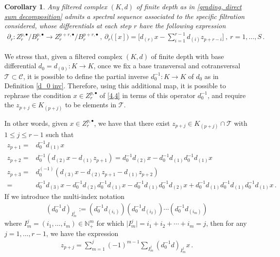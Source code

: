\documentclass[10pt]{amsart}
\newcounter{dummy} \numberwithin{dummy}{section}
\newtheorem{corollary}[dummy]{Corollary}
\theoremstyle{remark}
\numberwithin{equation}{section}
\begin{document}
\begin{corollary}
    Any filtered complex $(K,d)$ of finite depth as in \eqref{grading, direct sum decomposition} admits a spectral sequence associated to the specific filtration considered, whose differentials at each step $r$ have the following expression
    \begin{align*}
        \partial_r\colon Z_r^{p,\bullet}/B_r^{p,\bullet}\to Z_r^{p+r,\bullet}/B_r^{p+r,\bullet}\ ,\ \partial_r\big([x]\big)=\bigg[d_{(r)}x-\sum_{i=1}^{r-1}d_{(i)}z_{p+r-i}\bigg]\ ,\ r=1,\ldots,S\,.
    \end{align*} 
\end{corollary}
We stress that, given a filtered complex $(K,d)$ of finite depth with base differential $d_0=d_{(0)}\colon K\to K$, once we fix a base transversal and cotransversal $\mathcal{T}\subset\mathcal{C}$, it is possible to define the partial inverse $d_0^{-1}\colon K\to K$ of $d_0$ as in Definition \ref{d_0 inv}. Therefore, using this additional map, it is possible to rephrase the condition $x\in Z_r^{p,\bullet}$ of \eqref{4,4} in terms of this operator $d_0^{-1}$, and require the $z_{p+j}\in K_{(p+j)}$ to be elements in $\mathcal{T}$.

In other words, given $x\in Z_r^{p,\bullet}$, we have that there exist $z_{p+j}\in K_{(p+j)}\cap\mathcal{T}$ with $1\le j\le r-1$ such that
\begin{align*}
    z_{p+1}=&d_0^{-1}d_{(1)}x\\ z_{p+2}=&d_0^{-1}(d_{(2)}x-d_{(1)}z_{p+1})=d_0^{-1}d_{(2)}x-d_0^{-1}d_{(1)}d_0^{-1}d_{(1)}x\\ z_{p+3}=&d_0^{(-1)}(d_{(3)}x-d_{(2)}z_{p+1}-d_{(1)}z_{p+2})\\=&d_0^{-1}d_{(3)}x-d_0^{-1}d_{(2)}d_0^{-1}d_{(1)}x-d_0^{-1}d_{(1)}d_0^{-1}d_{(2)}x+d_{0}^{-1}d_{(1)}d_0^{-1}d_{(1)}d_0^{-1}d_{(1)}x\,.
\end{align*}
If we introduce the multi-index notation
\begin{align*}
    (d_0^{-1}d)_{I_m^j}:=(d_0^{-1}d_{(i_1)})(d_0^{-1}d_{(i_2)})\cdots(d_0^{-1}d_{(i_m)})
\end{align*}
where $I_m^j=(i_1,\ldots,i_m)\in\mathbb N_+^m$ for which $\vert I_m^j\vert=i_1+i_2+\cdots+i_m=j$, then for any $j=1,\ldots,r-1$, we have the expression
\begin{align}\label{18}
    z_{p+j}=\sum_{m=1}^j(-1)^{m-1}\sum_{I_m^j}(d_0^{-1}d)_{I_m^j}x\,.
\end{align}
\end{document}
